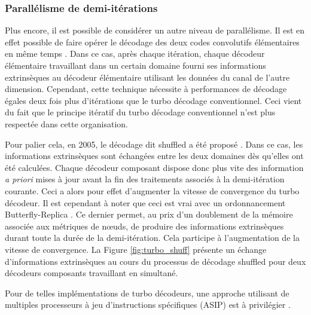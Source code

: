 \subsubsection{Parallélisme de demi-itérations}
Plus encore, il est possible de considérer un autre niveau de parallélisme. Il est en effet possible de faire opérer le 
décodage des deux codes convolutifs élémentaires en même temps \cite{turbo_par}. Dans ce cas, après chaque itération, 
chaque décodeur élémentaire travaillant dans un certain domaine fourni ses informations extrinsèques au décodeur 
élémentaire utilisant les données du canal de l'autre dimension. Cependant, cette technique nécessite à performances de 
décodage égales deux fois plus d'itérations que le turbo décodage conventionnel. Ceci vient du fait que le principe 
itératif du turbo décodage conventionnel n'est plus respectée dans cette organisation.

Pour palier cela, en 2005, le décodage dit shuffled a été proposé \cite{turbo_shuff}. Dans ce cas,  les informations extrinsèques sont échangées entre les deux domaines dès qu'elles ont 
été calculées. Chaque décodeur composant dispose donc plus vite des information \textit{a priori} mises à jour avant la 
fin des traitements associés à la demi-itération courante. Ceci a 
alors pour effet d'augmenter la vitesse de convergence du turbo décodeur. 
Il est cependant à noter que ceci est 
vrai avec un ordonnancement Butterfly-Replica \cite{butt_replica}. Ce dernier permet, au prix d'un doublement de 
la mémoire associée aux métriques de nœuds, de produire des informations extrinsèques durant toute la durée de la demi-itération. 
Cela participe à l'augmentation de la vitesse de convergence.
La Figure \ref{fig:turbo_shuff} présente un échange d'informations extrinsèques au cours du processus de décodage 
shuffled pour deux décodeurs composants travaillant en simultané.

Pour de telles implémentations de turbo décodeurs, une approche utilisant de multiples processeurs à jeu d’instructions 
spécifiques (ASIP) est à privilégier \cite{asip}.

